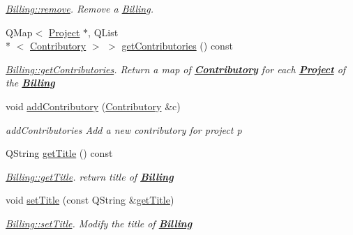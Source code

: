 \begin{DoxyCompactItemize}
\begin{DoxyCompactList}\small\item\em \hyperlink{classModels_1_1Billing_ada8a7c127a80fa7349fbd6a7d30ca4a3}{Billing\+::remove}. Remove a \hyperlink{classModels_1_1Billing}{Billing}. \end{DoxyCompactList}\item 
Q\+Map$<$ \hyperlink{classModels_1_1Project}{Project} $\ast$, Q\+List\\*
$<$ \hyperlink{classModels_1_1Contributory}{Contributory} $>$ $>$ \hyperlink{classModels_1_1Billing_a9c5e944c560fcecb356a9293b26f1ec6}{get\+Contributories} () const 
\begin{DoxyCompactList}\small\item\em \hyperlink{classModels_1_1Billing_a9c5e944c560fcecb356a9293b26f1ec6}{Billing\+::get\+Contributories}. Return a map of {\bfseries \hyperlink{classModels_1_1Contributory}{Contributory}} for each {\bfseries \hyperlink{classModels_1_1Project}{Project}} of the {\bfseries \hyperlink{classModels_1_1Billing}{Billing}} \end{DoxyCompactList}\item 
void \hyperlink{classModels_1_1Billing_a3636d785d2cb77d83d21a795e1f91a60}{add\+Contributory} (\hyperlink{classModels_1_1Contributory}{Contributory} \&c)
\begin{DoxyCompactList}\small\item\em add\+Contributories Add a new contributory for project p \end{DoxyCompactList}\item 
Q\+String \hyperlink{classModels_1_1Billing_a15cd358ce3cab05668c62c0771afdb85}{get\+Title} () const 
\begin{DoxyCompactList}\small\item\em \hyperlink{classModels_1_1Billing_a15cd358ce3cab05668c62c0771afdb85}{Billing\+::get\+Title}. return title of {\bfseries \hyperlink{classModels_1_1Billing}{Billing}} \end{DoxyCompactList}\item 
void \hyperlink{classModels_1_1Billing_ae20cea169abdffa5daaa368547425928}{set\+Title} (const Q\+String \&\hyperlink{classModels_1_1Billing_a15cd358ce3cab05668c62c0771afdb85}{get\+Title})
\begin{DoxyCompactList}\small\item\em \hyperlink{classModels_1_1Billing_ae20cea169abdffa5daaa368547425928}{Billing\+::set\+Title}. Modify the title of {\bfseries \hyperlink{classModels_1_1Billing}{Billing}} \end{DoxyCompactList}\item 

\end{DoxyCompactItemize}
